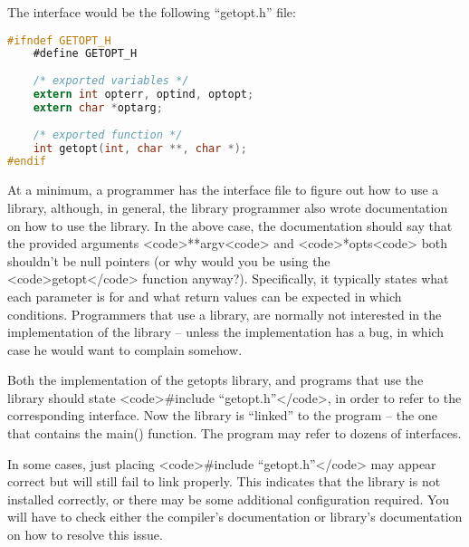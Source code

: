 The interface would be the following ``getopt.h'' file:
\lstset{basicstyle=\scriptsize, numbers=left, captionpos=b, tabsize=4}
\begin{lstlisting}[caption=Section \thesection listing \arabic{optcnt},language={C},
breaklines=true,xleftmargin=15pt,label=lst:section\thesection listing\arabic{optcnt}]
#ifndef GETOPT_H
	#define GETOPT_H
 
	/* exported variables */
	extern int opterr, optind, optopt;
	extern char *optarg;
 
	/* exported function */
	int getopt(int, char **, char *);
#endif
\end{lstlisting}

At a minimum, a programmer has the interface file to figure out how to use a
library, although, in general, the library programmer also wrote documentation
on how to use the library. In the above case, the documentation should say that
the provided arguments
\textless{}code\textgreater{}**argv\textless{}code\textgreater{} and
\textless{}code\textgreater{}*opts\textless{}code\textgreater{} both shouldn't
be null pointers (or why would you be using the
\textless{}code\textgreater{}getopt\textless{}/code\textgreater{} function
anyway?). Specifically, it typically states what each parameter is for and what
return values can be expected in which conditions. Programmers that use a
library, are normally not interested in the implementation of the library --
unless the implementation has a bug, in which case he would want to complain
somehow.

Both the implementation of the getopts library, and programs that use the
library should state \textless{}code\textgreater{}\#include
``getopt.h''\textless{}/code\textgreater{}, in order to refer to the
corresponding interface. Now the library is ``linked'' to the program -- the
one that contains the main() function. The program may refer to dozens of
interfaces.

In some cases, just placing \textless{}code\textgreater{}\#include
``getopt.h''\textless{}/code\textgreater{} may appear correct but will still
fail to link properly. This indicates that the library is not installed
correctly, or there may be some additional configuration required. You will
have to check either the compiler's documentation or library's documentation on
how to resolve this issue. 

